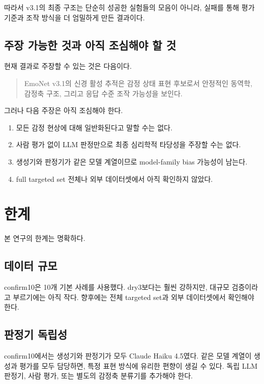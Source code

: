 \documentclass[11pt,a4paper]{article}
\begin{document}
따라서 v3.1의 최종 구조는 단순히 성공한 실험들의 모음이 아니라, 실패를 통해 평가 기준과 조작 방식을 더 엄밀하게 만든 결과이다.

\subsection{주장 가능한 것과 아직 조심해야 할 것}

현재 결과로 주장할 수 있는 것은 다음이다.

\begin{quote}
EmoNet v3.1의 신경 활성 추적은 감정 상태 표현 후보로서 안정적인 동역학, 감정축 구조, 그리고 응답 수준 조작 가능성을 보인다.
\end{quote}

그러나 다음 주장은 아직 조심해야 한다.

\begin{enumerate}
  \item 모든 감정 현상에 대해 일반화된다고 말할 수는 없다.
  \item 사람 평가 없이 LLM 판정만으로 최종 심리학적 타당성을 주장할 수는 없다.
  \item 생성기와 판정기가 같은 모델 계열이므로 model-family bias 가능성이 남는다.
  \item full targeted set 전체나 외부 데이터셋에서 아직 확인하지 않았다.
\end{enumerate}

\section{한계}

본 연구의 한계는 명확하다.

\subsection{데이터 규모}

confirm10은 10개 기본 사례를 사용했다. dry3보다는 훨씬 강하지만, 대규모 검증이라고 부르기에는 아직 작다. 향후에는 전체 targeted set과 외부 데이터셋에서 확인해야 한다.

\subsection{판정기 독립성}

confirm10에서는 생성기와 판정기가 모두 Claude Haiku 4.5였다. 같은 모델 계열이 생성과 평가를 모두 담당하면, 특정 표현 방식에 유리한 편향이 생길 수 있다. 독립 LLM 판정기, 사람 평가, 또는 별도의 감정축 분류기를 추가해야 한다.
\end{document}
